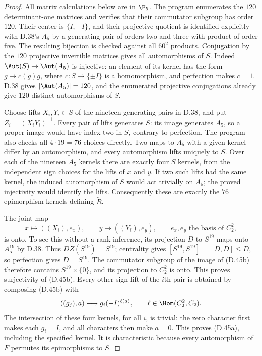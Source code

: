 \begin{proof}
All matrix calculations below are in $\F_5$.
The program enumerates the $120$ determinant-one matrices
and verifies that their commutator subgroup has order $120$.
Their center is $\{I,-I\}$, and their projective quotient is
identified explicitly with D.38's $A_5$ by a generating pair
of orders two and three with product of order five.
The resulting bijection is checked against all $60^2$
products.  Conjugation by the $120$ projective invertible
matrices gives all automorphisms of $S$.
Indeed $\Aut(S)\to\Aut(A_5)$ is injective: an element of
its kernel has the form $g\mapsto c(g)g$, where
$c:S\to\{\pm I\}$ is a homomorphism, and perfection makes
$c=1$.  D.38 gives $|\Aut(A_5)|=120$, and the enumerated
projective conjugations already give $120$ distinct
automorphisms of $S$.

Choose lifts $X_i,Y_i\in S$ of the nineteen generating
pairs in D.38, and put $Z_i=(X_iY_i)^{-1}$.
Every pair of lifts generates $S$: its image generates
$A_5$, so a proper image would have index two in $S$,
contrary to perfection.  The program also checks all
$4\cdot19=76$ choices directly.
Two maps to $A_5$ with a given kernel differ by an
automorphism, and every automorphism lifts uniquely to
$S$.  Over each of the nineteen $A_5$ kernels there
are exactly four $S$ kernels, from the independent
sign choices for the lifts of $x$ and $y$.
If two such lifts had the same kernel, the induced
automorphism of $S$ would act trivially on $A_5$;
the proved injectivity would identify the lifts.
Consequently these are exactly the $76$ epimorphism
kernels defining $\widetilde R$.

The joint map
\[
 x\longmapsto((X_i),e_x),\qquad
 y\longmapsto((Y_i),e_y),
        \qquad e_x,e_y\text{ the basis of }C_2^2,
                                                        \tag{D.45b}
\]
is onto.  To see this without a rank inference, its
projection $D$ to $S^{19}$ maps onto $A_5^{19}$ by
D.38.  Thus $D Z(S^{19})=S^{19}$; centrality gives
$[S^{19},S^{19}]=[D,D]\leq D$, so perfection gives
$D=S^{19}$.  The commutator subgroup of the image
of (D.45b) therefore contains $S^{19}\times\{0\}$,
and its projection to $C_2^2$ is onto.  This proves
surjectivity of (D.45b).
Every other sign lift of the $i$th pair is obtained by
composing (D.45b) with
\[
 ((g_j),a)\longmapsto g_i(-I)^{\ell(a)},
                         \qquad \ell\in\Hom(C_2^2,C_2).
\]
The intersection of these four kernels, for all $i$,
is trivial: the zero character first makes each
$g_i=I$, and all characters then make $a=0$.
This proves (D.45a), including the specified kernel.
It is characteristic because every automorphism of
$F$ permutes its epimorphisms to $S$.


\end{proof}
